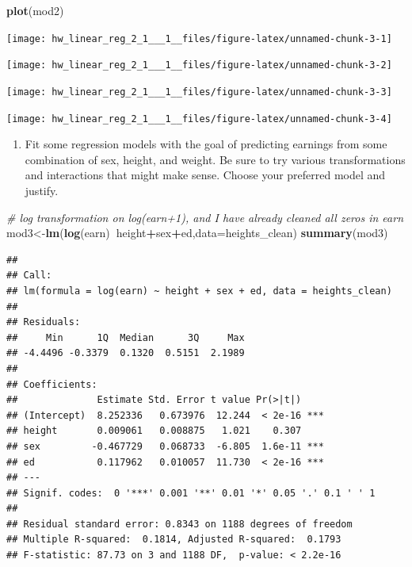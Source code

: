 \documentclass[]{article}
\newenvironment{Shaded}{\begin{snugshade}}{\end{snugshade}}
\newcommand{\KeywordTok}[1]{\textcolor[rgb]{0.13,0.29,0.53}{\textbf{#1}}}
\newcommand{\DataTypeTok}[1]{\textcolor[rgb]{0.13,0.29,0.53}{#1}}
\newcommand{\CommentTok}[1]{\textcolor[rgb]{0.56,0.35,0.01}{\textit{#1}}}
\newcommand{\OperatorTok}[1]{\textcolor[rgb]{0.81,0.36,0.00}{\textbf{#1}}}
\newcommand{\NormalTok}[1]{#1}
\providecommand{\tightlist}{%
  \setlength{\itemsep}{0pt}\setlength{\parskip}{0pt}}
\begin{document}
\begin{Shaded}
\begin{Highlighting}[]
\KeywordTok{plot}\NormalTok{(mod2)}
\end{Highlighting}
\end{Shaded}

\begin{center}\texttt{[image: hw\_linear\_reg\_2\_1\_\_\_1\_\_files/figure-latex/unnamed-chunk-3-1]} \end{center}

\begin{center}\texttt{[image: hw\_linear\_reg\_2\_1\_\_\_1\_\_files/figure-latex/unnamed-chunk-3-2]} \end{center}

\begin{center}\texttt{[image: hw\_linear\_reg\_2\_1\_\_\_1\_\_files/figure-latex/unnamed-chunk-3-3]} \end{center}

\begin{center}\texttt{[image: hw\_linear\_reg\_2\_1\_\_\_1\_\_files/figure-latex/unnamed-chunk-3-4]} \end{center}

\begin{enumerate}
\def\labelenumi{\arabic{enumi}.}
\setcounter{enumi}{2}
\tightlist
\item
  Fit some regression models with the goal of predicting earnings from
  some combination of sex, height, and weight. Be sure to try various
  transformations and interactions that might make sense. Choose your
  preferred model and justify.
\end{enumerate}

\begin{Shaded}
\begin{Highlighting}[]
\CommentTok{# log transformation on log(earn+1), and I have already cleaned all zeros in earn}
\NormalTok{mod3<-}\KeywordTok{lm}\NormalTok{(}\KeywordTok{log}\NormalTok{(earn)}\OperatorTok{~}\NormalTok{height}\OperatorTok{+}\NormalTok{sex}\OperatorTok{+}\NormalTok{ed,}\DataTypeTok{data=}\NormalTok{heights_clean)}
\KeywordTok{summary}\NormalTok{(mod3)}
\end{Highlighting}
\end{Shaded}

\begin{verbatim}
## 
## Call:
## lm(formula = log(earn) ~ height + sex + ed, data = heights_clean)
## 
## Residuals:
##     Min      1Q  Median      3Q     Max 
## -4.4496 -0.3379  0.1320  0.5151  2.1989 
## 
## Coefficients:
##              Estimate Std. Error t value Pr(>|t|)    
## (Intercept)  8.252336   0.673976  12.244  < 2e-16 ***
## height       0.009061   0.008875   1.021    0.307    
## sex         -0.467729   0.068733  -6.805  1.6e-11 ***
## ed           0.117962   0.010057  11.730  < 2e-16 ***
## ---
## Signif. codes:  0 '***' 0.001 '**' 0.01 '*' 0.05 '.' 0.1 ' ' 1
## 
## Residual standard error: 0.8343 on 1188 degrees of freedom
## Multiple R-squared:  0.1814, Adjusted R-squared:  0.1793 
## F-statistic: 87.73 on 3 and 1188 DF,  p-value: < 2.2e-16
\end{verbatim}
\end{document}
